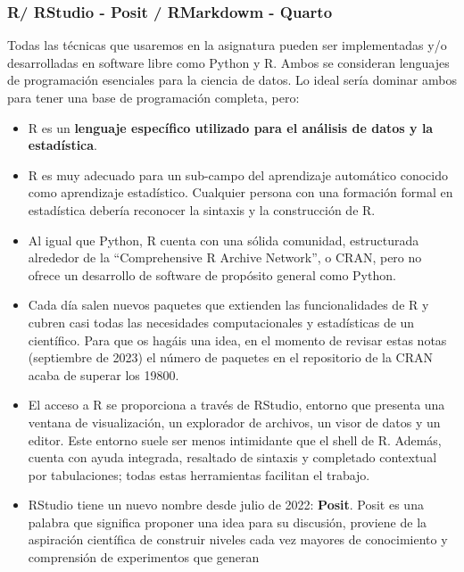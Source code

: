 \documentclass[
  letterpaper,
  DIV=11,
  numbers=noendperiod]{scrreprt}
\begin{document}
\hypertarget{r-rstudio---posit-rmarkdowm---quarto}{%
\subsubsection{R/ RStudio - Posit / RMarkdowm -
Quarto}\label{r-rstudio---posit-rmarkdowm---quarto}}

Todas las técnicas que usaremos en la asignatura pueden ser
implementadas y/o desarrolladas en software libre como Python y R. Ambos
se consideran lenguajes de programación esenciales para la ciencia de
datos. Lo ideal sería dominar ambos para tener una base de programación
completa, pero:

\begin{itemize}
\item
  R es un \textbf{lenguaje específico utilizado para el análisis de
  datos y la estadística}.
\item
  R es muy adecuado para un sub-campo del aprendizaje automático
  conocido como aprendizaje estadístico. Cualquier persona con una
  formación formal en estadística debería reconocer la sintaxis y la
  construcción de R.
\item
  Al igual que Python, R cuenta con una sólida comunidad, estructurada
  alrededor de la ``Comprehensive R Archive Network'', o CRAN, pero no
  ofrece un desarrollo de software de propósito general como Python.
\item
  Cada día salen nuevos paquetes que extienden las funcionalidades de R
  y cubren casi todas las necesidades computacionales y estadísticas de
  un científico. Para que os hagáis una idea, en el momento de revisar
  estas notas (septiembre de 2023) el número de paquetes en el
  repositorio de la CRAN acaba de superar los 19800.
\item
  El acceso a R se proporciona a través de RStudio, entorno que presenta
  una ventana de visualización, un explorador de archivos, un visor de
  datos y un editor. Este entorno suele ser menos intimidante que el
  shell de R. Además, cuenta con ayuda integrada, resaltado de sintaxis
  y completado contextual por tabulaciones; todas estas herramientas
  facilitan el trabajo.
\item
  RStudio tiene un nuevo nombre desde julio de 2022: \textbf{Posit}.
  Posit es una palabra que significa proponer una idea para su
  discusión, proviene de la aspiración científica de construir niveles
  cada vez mayores de conocimiento y comprensión de experimentos que
  generan
\end{itemize}
\end{document}
